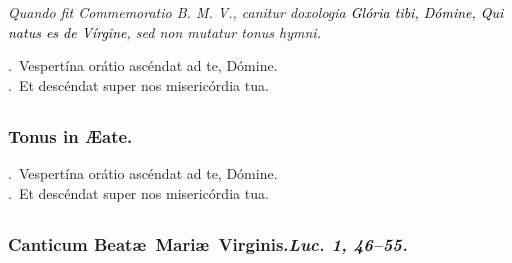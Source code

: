 \documentclass[12pt]{article} %
\newenvironment{rubric}{\color{benred8} \itshape \leftskip 0in \setlength{\parindent}{0.25in}}{\vspace{2 mm}}
\newenvironment{response}{\leftskip 0in \setlength{\parindent}{0in}}{\vspace{2 mm}}
\let\oldVbar\Vbar
\renewcommand{\Vbar}{\textcolor{benred8}{\oldVbar .}}
\let\oldRbar\Rbar
\renewcommand{\Rbar}{\textcolor{benred8}{\oldRbar .}}
\def\capitulumSpace{\hspace{20 mm}}
\begin{document}
\begin{rubric}
Quando fit Commemoratio B. M. V., canitur doxologia \emph{\textcolor{black}{Gl\'{o}ria tibi, D\'{o}mine, Qui natus es de V\'{i}rgine}}, sed non mutatur tonus hymni.

\end{rubric}

\begin{response}
\Vbar\ Vespert\'{i}na or\'{a}tio asc\'{e}ndat ad te, D\'{o}mine.\\
\Rbar\ Et desc\'{e}ndat super nos miseric\'{o}rdia tua.

\end{response}


\subsection*{}

\subsubsection*{Tonus in \AE {}ate.}


\gresetfirstlineaboveinitial{\small \textsc{ \textbf{\textcolor{benred8}{VIII}}}}{\small \textsc{ \textbf{\textcolor{benred8}{VIII}}}}

\begin{response}
\Vbar\ Vespert\'{i}na or\'{a}tio asc\'{e}ndat ad te, D\'{o}mine.\\
\Rbar\ Et desc\'{e}ndat super nos miseric\'{o}rdia tua.

\end{response}


\subsection*{}

\subsubsection*{Canticum Beat\ae\ Mari\ae\ Virginis.\capitulumSpace \emph{Luc. 1, 46--55.}}

\end{document}
